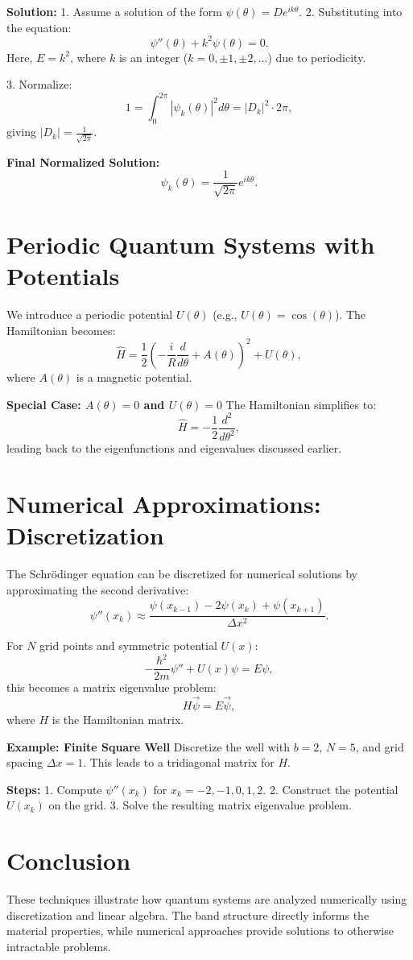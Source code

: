 \documentclass[a4paper,12pt]{article}
\begin{document}
\begin{multicols}{2}
\textbf{Solution:}
1. Assume a solution of the form $\psi(\theta) = De^{ik\theta}$.
2. Substituting into the equation:
   \[
   \psi''(\theta) + k^2\psi(\theta) = 0.
   \]
   Here, $E = k^2$, where $k$ is an integer ($k = 0, \pm 1, \pm 2, \dots$) due to periodicity.  

3. Normalize:
   \[
   1 = \int_0^{2\pi} |\psi_k(\theta)|^2 d\theta = |D_k|^2 \cdot 2\pi,
   \]
   giving $|D_k| = \frac{1}{\sqrt{2\pi}}$.  

\textbf{Final Normalized Solution:}
\[
\psi_k(\theta) = \frac{1}{\sqrt{2\pi}}e^{ik\theta}.
\]

\section{Periodic Quantum Systems with Potentials}
We introduce a periodic potential $U(\theta)$ (e.g., $U(\theta) = \cos(\theta)$). The Hamiltonian becomes:
\[
\hat{H} = \frac{1}{2}\left(-\frac{i}{R}\frac{d}{d\theta} + A(\theta) \right)^2 + U(\theta),
\]
where $A(\theta)$ is a magnetic potential.

\textbf{Special Case: $A(\theta) = 0$ and $U(\theta) = 0$}  
The Hamiltonian simplifies to:
\[
\hat{H} = -\frac{1}{2}\frac{d^2}{d\theta^2},
\]
leading back to the eigenfunctions and eigenvalues discussed earlier.

\section{Numerical Approximations: Discretization}
The Schrödinger equation can be discretized for numerical solutions by approximating the second derivative:
\[
\psi''(x_k) \approx \frac{\psi(x_{k-1}) - 2\psi(x_k) + \psi(x_{k+1})}{\Delta x^2}.
\]

For $N$ grid points and symmetric potential $U(x)$:
\[
-\frac{\hbar^2}{2m}\psi'' + U(x)\psi = E\psi,
\]
this becomes a matrix eigenvalue problem:
\[
H\vec{\psi} = E\vec{\psi},
\]
where $H$ is the Hamiltonian matrix.  

\textbf{Example: Finite Square Well}  
Discretize the well with $b = 2$, $N=5$, and grid spacing $\Delta x = 1$. This leads to a tridiagonal matrix for $H$.

\textbf{Steps:}
1. Compute $\psi''(x_k)$ for $x_k = -2, -1, 0, 1, 2$.  
2. Construct the potential $U(x_k)$ on the grid.  
3. Solve the resulting matrix eigenvalue problem.

\section{Conclusion}
These techniques illustrate how quantum systems are analyzed numerically using discretization and linear algebra. The band structure directly informs the material properties, while numerical approaches provide solutions to otherwise intractable problems.



\end{multicols}
\end{document}
